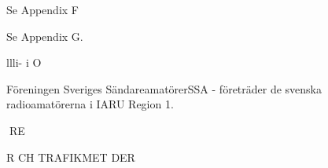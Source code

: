 Se Appendix F

Se Appendix G.

llli- i O

Föreningen Sveriges SändareamatörerSSA - företräder de svenska radioamatörerna i IARU Region 1.

RE

R CH TRAFIKMET DER
